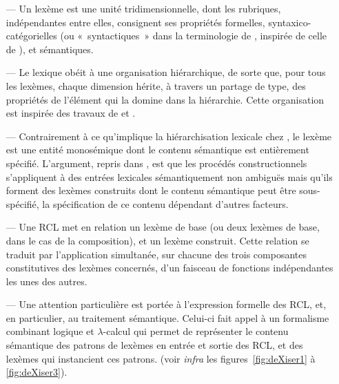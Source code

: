 \documentclass[output=paper]{langsci/langscibook}
\begin{document}
\begin{itemize}

\item[---] Un lexème est une unité tridimensionnelle, dont les rubriques, indépendantes entre elles, consignent ses propriétés formelles, syntaxico-catégorielles (ou «~syntactiques~» dans la terminologie de \citet{Fradin03}, inspirée de celle de \citet{melcuk1993.cours-morpho-gen}), et sémantiques.

\sloppy
\item[---] Le lexique obéit à une organisation hiérarchique, de sorte que, pour tous les lexèmes,  chaque dimension hérite, à travers un partage de type,  des propriétés de l'élément qui la domine dans la hiérarchie. Cette organisation est inspirée des travaux de \citet{Koenig99} et \citet{Davis00}.
\fussy 

\item[---] Contrairement à ce qu'implique la hiérarchisation lexicale chez \citet{Koenig99}, le lexème est une entité monosémique dont le contenu sémantique est entièrement spécifié.  L'argument, repris dans \citet{fradin2003.forum3,fradin2003.mmm}, est que les procédés constructionnels s'appliquent  à des entrées lexicales sémantiquement non ambiguës mais qu'ils forment des lexèmes construits dont le contenu sémantique peut être sous-spécifié, la spécification de ce contenu dépendant d'autres facteurs.

\item[---] Une RCL met en relation un lexème de base (ou deux lexèmes de base, dans le cas de la composition), et un lexème construit.  Cette relation se traduit par l'application simultanée, sur chacune des trois composantes constitutives des lexèmes concernés, d'un faisceau de fonctions indépendantes les unes des autres.

\item[---] Une attention particulière est portée à l'expression formelle des RCL, et, en particulier, au traitement sémantique.  Celui-ci fait appel à un formalisme combinant logique et $\lambda$-calcul qui permet de représenter le contenu sémantique des patrons de lexèmes en entrée et sortie des RCL, et des lexèmes qui instancient ces patrons. (voir \emph{infra} les figures~\ref{fig:deXiser1} à \ref{fig:deXiser3}).

\end{itemize}
\end{document}
